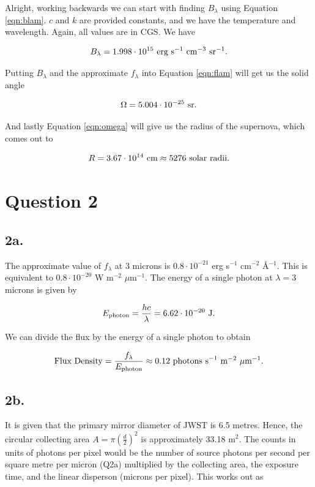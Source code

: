 \documentclass{article}
\begin{document}
Alright, working backwards we can start with finding $B_\lambda$ using Equation \ref{eqn:blam}. $c$ and $k$ are provided constants, and we have the temperature and wavelength. Again, all values are in CGS. We have

\begin{equation*}
    B_\lambda=1.998\cdot10^{15}\textup{ erg s}^{-1}\textup{ cm}^{-3}\textup{ sr}^{-1}.
\end{equation*}

Putting $B_\lambda$ and the approximate $f_\lambda$ into Equation \ref{eqn:flam} will get us the solid angle

\begin{equation*}
    \Omega=5.004\cdot10^{-25}\textup{ sr}.
\end{equation*}

And lastly Equation \ref{eqn:omega} will give us the radius of the supernova, which comes out to

\begin{equation*}
    R=3.67\cdot10^{14}\textup{ cm}\approx5276\textup{ solar radii}.
\end{equation*}

\section*{Question 2}

\subsection*{2a.}
The approximate value of $f_\lambda$ at 3 microns is $0.8\cdot10^{-21}$ erg s$^{-1}$ cm$^{-2}$ \r{A}$^{-1}$. This is equivalent to $0.8\cdot10^{-20}$ W m$^{-2}$ $\mu$m$^{-1}$. The energy of a single photon at $\lambda=3$ microns is given by

\begin{equation*}
    E_\textup{photon}=\frac{hc}{\lambda}=6.62\cdot10^{-20}\textup{ J.}
\end{equation*}

We can divide the flux by the energy of a single photon to obtain

\begin{equation*}
    \textup{Flux Density} = \frac{f_\lambda}{E_\textup{photon}}\approx0.12\textup{ photons s}^{-1}\textup{ m}^{-2}\textup{ }\mu\textup{m}^{-1}.
\end{equation*}

\subsection*{2b.}
It is given that the primary mirror diameter of JWST is 6.5 metres. Hence, the circular collecting area $A=\pi(\frac d 2)^2$ is approximately 33.18 m$^2$. The counts in units of photons per pixel would be the number of source photons per second per square metre per micron (Q2a) multiplied by the collecting area, the exposure time, and the linear disperson (microns per pixel). This works out as
\end{document}
